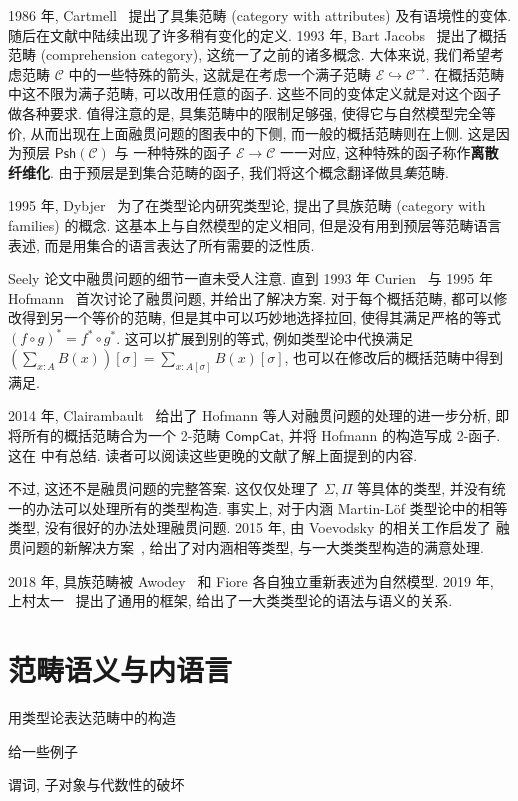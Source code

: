 1986 年, Cartmell~\cite{cartmell:1986:contextualcat}
提出了具集范畴 (category with attributes) 及有语境性的变体.
随后在文献中陆续出现了许多稍有变化的定义.
1993 年, Bart Jacobs~\cite{jacobs:1993:comprehensioncat}
提出了概括范畴 (comprehension category), 这统一了之前的诸多概念.
大体来说, 我们希望考虑范畴 \(\mathcal{C}\) 中的一些特殊的箭头,
这就是在考虑一个满子范畴 \(\mathcal{E} \hookrightarrow \mathcal{C}^\to\).
在概括范畴中这不限为满子范畴, 可以改用任意的函子.
这些不同的变体定义就是对这个函子做各种要求.
值得注意的是, 具集范畴中的限制足够强, 使得它与自然模型完全等价,
从而出现在上面融贯问题的图表中的下侧, 而一般的概括范畴则在上侧.
这是因为预层 \(\mathsf{Psh}(\mathcal{C})\) 与
一种特殊的函子 \(\mathcal{E} \to \mathcal{C}\) 一一对应,
这种特殊的函子称作\textbf{离散纤维化}.
由于预层是到集合范畴的函子, 我们将这个概念翻译做具\emph{集}范畴.

1995 年, Dybjer~\cite{dybjer:1995:internal}
为了在类型论内研究类型论, 提出了具族范畴 (category with families) 的概念.
这基本上与自然模型的定义相同, 但是没有用到预层等范畴语言表述,
而是用集合的语言表达了所有需要的泛性质.

Seely 论文中融贯问题的细节一直未受人注意.
直到 1993 年 Curien~\cite{curien:1993:coherence} 与
1995 年 Hofmann~\cite{hofmann:1995:lccccoh}
首次讨论了融贯问题, 并给出了解决方案.
对于每个概括范畴, 都可以修改得到另一个等价的范畴,
但是其中可以巧妙地选择拉回, 使得其满足严格的等式 \((f \circ g)^* = f^* \circ g^*\).
这可以扩展到别的等式, 例如类型论中代换满足
\((\sum_{x : A} B(x))[\sigma] = \sum_{x : A[\sigma]} B(x)[\sigma]\),
也可以在修改后的概括范畴中得到满足.

2014 年, Clairambault~\cite{clairambault:2014:biequivalence}
给出了 Hofmann 等人对融贯问题的处理的进一步分析,
即将所有的概括范畴合为一个 2-范畴 \(\mathsf{CompCat}\),
并将 Hofmann 的构造写成 2-函子.
这在 \cite{curien:2014:revisit} 中有总结.
读者可以阅读这些更晚的文献了解上面提到的内容.

不过, 这还不是融贯问题的完整答案.
这仅仅处理了 \(\Sigma, \Pi\) 等具体的类型,
并没有统一的办法可以处理所有的类型构造.
事实上, 对于内涵 Martin-Löf 类型论中的相等类型,
没有很好的办法处理融贯问题.
2015 年, 由 Voevodsky 的相关工作启发了
融贯问题的新解决方案~\cite{lumsdaine:2015:universes},
给出了对内涵相等类型, 与一大类类型构造的满意处理.

2018 年, 具族范畴被 Awodey~\cite{awodey:2018:natural} 和 Fiore 各自独立重新表述为自然模型.
2019 年, 上村太一~\cite{uemura:2019:general}
提出了通用的框架, 给出了一大类类型论的语法与语义的关系.

\section{范畴语义与内语言}\label{category:inner}

用类型论表达范畴中的构造

给一些例子

谓词, 子对象与代数性的破坏

